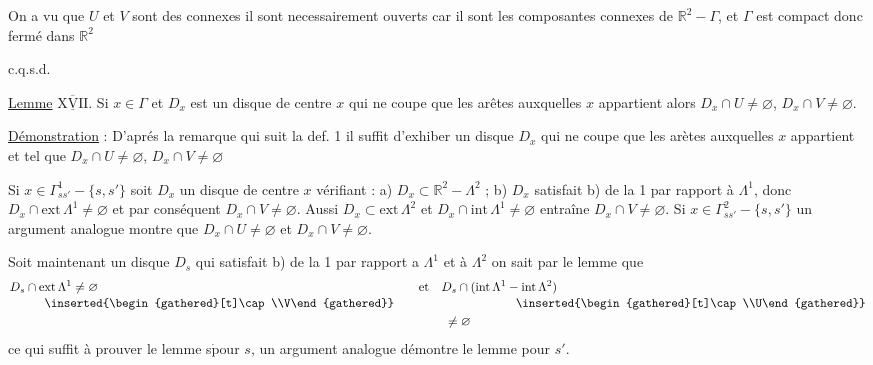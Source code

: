 On a vu que $U$ et $V$ sont des connexes il sont necessairement ouverts car il sont les composantes connexes de $\mathbb{R}^{2}-\Gamma$, et $\Gamma$ est compact donc fermé dans $\mathbb{R}^{2}$\unsure{)|,|;}

\hfill c.q.s.d.

\uline{Lemme} $\underline{\overline{\mathrm{XVII}}}$. Si $x\in\Gamma$ et $D_x$ est un disque de centre $x$ qui ne coupe que les arêtes auxquelles $x$ appartient alors $D_x\cap U\ne\varnothing$, $D_x\cap V\ne\varnothing$.

\uline{Démonstration} : D'aprés la remarque qui suit la def. 1 il suffit d'exhiber un disque $D_x$ qui ne coupe que les arètes auxquelles $x$ appartient et tel que $D_x\cap U\ne\varnothing$, $D_x\cap V\ne\varnothing$

Si $x\in\Gamma^{1}_{ss'}-\{s,s'\}$ soit $D_x$ un disque de centre $x$ vérifiant : a) $D_x\subset\mathbb{R}^{2}-\Lambda^{2}$ ; b) $D_x$ satisfait b) de la  1 par rapport à $\Lambda^{1}$, donc $D_x\cap\mathrm{ext}\,\Lambda^{1}\ne\varnothing$ et par conséquent $D_x\cap V\ne\varnothing$. Aussi $D_x\subset\mathrm{ext}\,\Lambda^{2}$ et $D_x\cap\mathrm{int}\,\Lambda^{1}\ne\varnothing$ entraîne $D_x\cap V\ne\varnothing$. Si $x\in\Gamma^{2}_{ss'}-\{s,s'\}$ un argument analogue montre que $D_x\cap U\ne\varnothing$ et $D_x\cap V\ne\varnothing$.

Soit maintenant un disque $D_s$ qui satisfait b) de la  1 par rapport a $\Lambda^{1}$ et à $\Lambda^{2}$ on sait par le lemme  que
\[
\begin{aligned}
D_s\cap{}&\mathrm{ext}\,\Lambda^{1}\ne\varnothing
  &\quad\text{et}\quad D_s\cap{}&(\mathrm{int}\,\Lambda^{1}-\mathrm{int}\,\Lambda^{2})\\[-.5ex]
 &\hphantom{\mathrm{e}}\inserted{\begin{gathered}[t]\cap\\V\end{gathered}}
  &\begin{gathered}[t]\vphantom{\cap}\\\ne\varnothing\end{gathered}
  &\hphantom{(\mathrm{int}\,\Lambda^{1}-}\inserted{\begin{gathered}[t]\cap\\U\end{gathered}}
\end{aligned}
\]
ce qui suffit à prouver le lemme s$\dot{\mathrm{p}}$our $s$, un argument analogue démontre le lemme pour $s'$.

